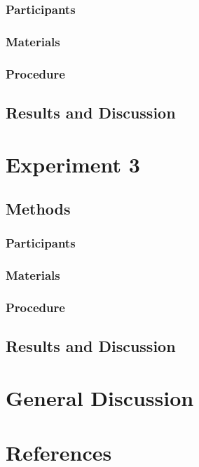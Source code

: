 \documentclass[man,floatsintext]{apa6}
\begin{document}
\hypertarget{participants-1}{%
\subsubsection{Participants}\label{participants-1}}

\hypertarget{materials-1}{%
\subsubsection{Materials}\label{materials-1}}

\hypertarget{procedure-1}{%
\subsubsection{Procedure}\label{procedure-1}}

\hypertarget{results-and-discussion-1}{%
\subsection{Results and Discussion}\label{results-and-discussion-1}}

\hypertarget{experiment-3}{%
\section{Experiment 3}\label{experiment-3}}

\hypertarget{methods-2}{%
\subsection{Methods}\label{methods-2}}

\hypertarget{participants-2}{%
\subsubsection{Participants}\label{participants-2}}

\hypertarget{materials-2}{%
\subsubsection{Materials}\label{materials-2}}

\hypertarget{procedure-2}{%
\subsubsection{Procedure}\label{procedure-2}}

\hypertarget{results-and-discussion-2}{%
\subsection{Results and Discussion}\label{results-and-discussion-2}}

\hypertarget{general-discussion}{%
\section{General Discussion}\label{general-discussion}}

\newpage

\hypertarget{references}{%
\section{References}\label{references}}

\begingroup
\setlength{\parindent}{-0.5in}
\setlength{\leftskip}{0.5in}

\hypertarget{refs}{}

\endgroup
\end{document}
